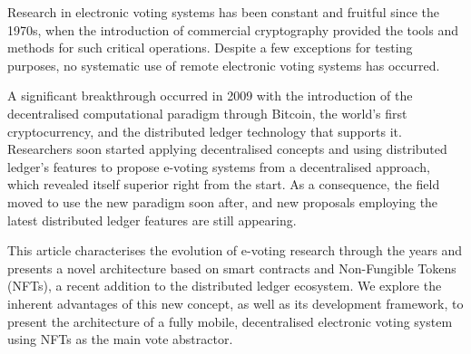 \documentclass[../main.tex]{subfiles}
\begin{document}
Research in electronic voting systems has been constant and fruitful since the 1970s, when the introduction of commercial cryptography provided the tools and methods for such critical operations. Despite a few exceptions for testing purposes, no systematic use of remote electronic voting systems has occurred.
\par
A significant breakthrough occurred in 2009 with the introduction of the decentralised computational paradigm through Bitcoin, the world's first cryptocurrency, and the distributed ledger technology that supports it. Researchers soon started applying decentralised concepts and using distributed ledger's features to propose e-voting systems from a decentralised approach, which revealed itself superior right from the start. As a consequence, the field moved to use the new paradigm soon after, and new proposals employing the latest distributed ledger features are still appearing.
\par
This article characterises the evolution of e-voting research through the years and presents a novel architecture based on smart contracts and Non-Fungible Tokens (NFTs), a recent addition to the distributed ledger ecosystem. We explore the inherent advantages of this new concept, as well as its development framework, to present the architecture of a fully mobile, decentralised electronic voting system using NFTs as the main vote abstractor.
\end{document}
